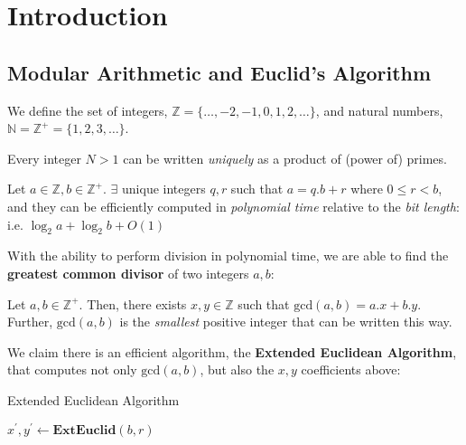 \setcounter{chapter}{3}
\setcounter{lecture}{18}
\chapter{Introduction}
\section{Modular Arithmetic and Euclid's Algorithm}
We define the set of integers, \( \mathbb{Z} = \{ \ldots, -2, -1, 0, 1, 2, \ldots \} \), 
and natural numbers, \( \mathbb{N} = \mathbb{Z}^+ = \{ 1, 2, 3, \ldots \} \).

\begin{theorem}\label{ProductOfPrimes}
	Every integer \( N > 1 \) can be written \emph{uniquely} as
	a product of (power of) primes.
\end{theorem}

\begin{lemma}\label{DivisionWithRemainder}
	Let \( a \in \mathbb{Z}, b \in \mathbb{Z}^+ \). $\exists$ unique
	integers $q, r$ such that \( a = q . b + r \) where \( 0 \leq r < b \),    
	and they can be efficiently computed in \emph{polynomial time}
	relative to the \emph{bit length}: i.e. \( \log_2 a + \log_2 b + O(1) \) 
\end{lemma}

With the ability to perform division in polynomial time, we are able
to find the \textbf{greatest common divisor} of two integers $a, b$:

\begin{definition}\label{gcd}
	Let \( a, b \in \mathbb{Z}^+ \). Then, there exists \( x, y \in 
	\mathbb{Z} \) such that \( \text{gcd}(a, b) = a.x  + b.y \).   
	Further, \( \text{gcd}(a, b) \) is the \emph{smallest} positive integer
	that can be written this way. 
\end{definition}

We claim there is an efficient algorithm, the \textbf{Extended Euclidean Algorithm},
that computes not only \( \text{gcd}(a, b) \), but also the \( x, y \) coefficients above:

\begin{algorithm}[H]\label{eea}
	\DontPrintSemicolon
	\caption{Extended Euclidean Algorithm}
	\(x^{\prime}, y^{\prime} \gets \mathbf{ExtEuclid}(b, r) \)\; 
	\;
\end{algorithm}

